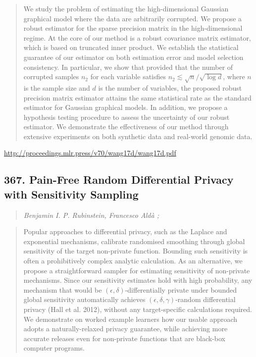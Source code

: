\documentclass{article}
\begin{document}
\begin{quote}
    We study the problem of estimating the high-dimensional Gaussian graphical model where the data are arbitrarily corrupted. We propose a robust estimator for the sparse precision matrix in the high-dimensional regime. At the core of our method is a robust covariance matrix estimator, which is based on truncated inner product. We establish the statistical guarantee of our estimator on both estimation error and model selection consistency. In particular, we show that provided that the number of corrupted samples $n_2$ for each variable satisfies $n_2 \lesssim \sqrt{n}/\sqrt{\log d}$, where $n$ is the sample size and $d$ is the number of variables, the proposed robust precision matrix estimator attains the same statistical rate as the standard estimator for Gaussian graphical models. In addition, we propose a hypothesis testing procedure to assess the uncertainty of our robust estimator. We demonstrate the effectiveness of our method through extensive experiments on both synthetic data and real-world genomic data.  \end{quote}

\href{http://proceedings.mlr.press/v70/wang17d/wang17d.pdf}{http://proceedings.mlr.press/v70/wang17d/wang17d.pdf}

\subsection{367. Pain-Free Random Differential Privacy with Sensitivity Sampling}

\begin{quote}
\footnotesize{\textit{Benjamin I. P. Rubinstein, Francesco Aldà ;}}
\end{quote}

\begin{quote}
    Popular approaches to differential privacy, such as the Laplace and exponential mechanisms, calibrate randomised smoothing through global sensitivity of the target non-private function. Bounding such sensitivity is often a prohibitively complex analytic calculation. As an alternative, we propose a straightforward sampler for estimating sensitivity of non-private mechanisms. Since our sensitivity estimates hold with high probability, any mechanism that would be $(\epsilon,\delta)$-differentially private under bounded global sensitivity automatically achieves $(\epsilon,\delta,\gamma)$-random differential privacy (Hall et al. 2012), without any target-specific calculations required. We demonstrate on worked example learners how our usable approach adopts a naturally-relaxed privacy guarantee, while achieving more accurate releases even for non-private functions that are black-box computer programs.  \end{quote}
\end{document}
